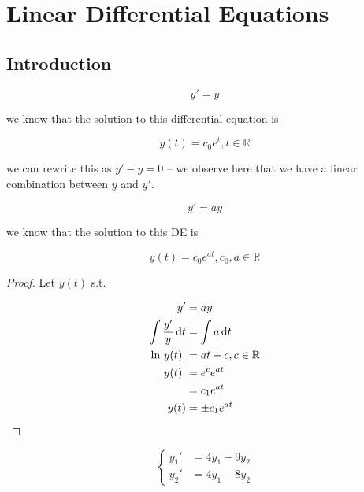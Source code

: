 \chapter{Linear Differential Equations}

\section{Introduction}

	\begin{example}
		\[y' = y\]
	\end{example}

	we know that the solution to this differential equation is

	\[y(t) = c_0 e^t, t \in \mathbb{R}\]

	we can rewrite this as $y' - y = 0$ -- we observe here that we have a linear combination between $y$ and $y'$.

	\begin{example}
		\[y' = ay\]
	\end{example}

	we know that the solution to this DE is

	\[y(t) = c_0 e^{at}, c_0, a \in \mathbb{R}\]

	\begin{proof}
		Let $y(t)$ s.t.

		\begin{align*}
			y' &= ay\\
			\int \frac{y'}{y} \D t &= \int a \D t\\
			\ln \abs{y(t)} &= at + c, c \in \mathbb{R}\\
			\abs{y(t)} &= e^c e^{at}\\
			&= c_1 e^{at}\\
			y(t) &= \pm c_1 e^{at}
		\end{align*}
	\end{proof}

	\begin{example}
		\[\begin{cases}
			y_1' &= 4y_1 - 9y_2\\
			y_2' &= 4y_1 - 8y_2
		\end{cases}\]
	\end{example}

